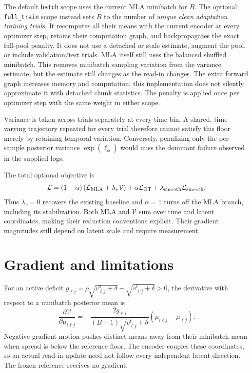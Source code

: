 \documentclass[11pt,a4paper]{article}
\begin{document}
The default \texttt{batch} scope uses the current MLA minibatch for $B$.
The optional \texttt{full\_train} scope instead sets $B$ to the number of
\emph{unique clean adaptation training trials}. It recomputes all their means
with the current encoder at every optimizer step, retains their computation
graph, and backpropagates the exact full-pool penalty. It does not use a
detached or stale estimate, augment the pool, or include validation/test
trials. MLA itself still uses the balanced shuffled minibatch. This removes
minibatch sampling variation from the variance estimate, but the estimate
still changes as the read-in changes. The extra forward graph increases
memory and computation; this implementation does not silently approximate it
with detached chunk statistics. The penalty is applied once per optimizer
step with the same weight in either scope.

Variance is taken across trials separately at every time bin. A shared,
time-varying trajectory repeated for every trial therefore cannot satisfy
this floor merely by retaining temporal variation. Conversely, penalizing only
the per-sample posterior variance $\exp(\ell_\phi)$ would miss the dominant
failure observed in the supplied logs.

The total optional objective is
\begin{equation}
 \mathcal L=(1-\alpha)
       \left(\mathcal L_{\rm MLA}+\lambda_v\mathcal V\right)
       +\alpha\mathcal L_{\rm OT}
       +\lambda_{\rm smooth}\mathcal L_{\rm smooth}.
 \label{eq:total}
\end{equation}
Thus $\lambda_v=0$ recovers the existing baseline and $\alpha=1$ turns off the
MLA branch, including its stabilization. Both MLA and $\mathcal V$ sum over
time and latent coordinates, making their reduction conventions explicit.
Their gradient magnitudes still depend on latent scale and require measurement.

\section{Gradient and limitations}

For an active deficit
$g_{\ell j}=\rho\sqrt{v^s_{\ell j}+\delta}-\sqrt{v^t_{\ell j}+\delta}>0$,
the derivative with respect to a minibatch posterior mean is
\begin{equation}
 \frac{\partial\mathcal V}{\partial\mu_{i\ell j}}
 =-\frac{2g_{\ell j}}{(B-1)\sqrt{v^t_{\ell j}+\delta}}
       (\mu_{i\ell j}-\overline\mu_{\ell j}).
\end{equation}
Negative-gradient motion pushes distinct means away from their minibatch
mean when spread is below the reference floor. The encoder couples these
coordinates, so an actual read-in update need not follow every independent
latent direction. The frozen reference receives no gradient.
\end{document}
